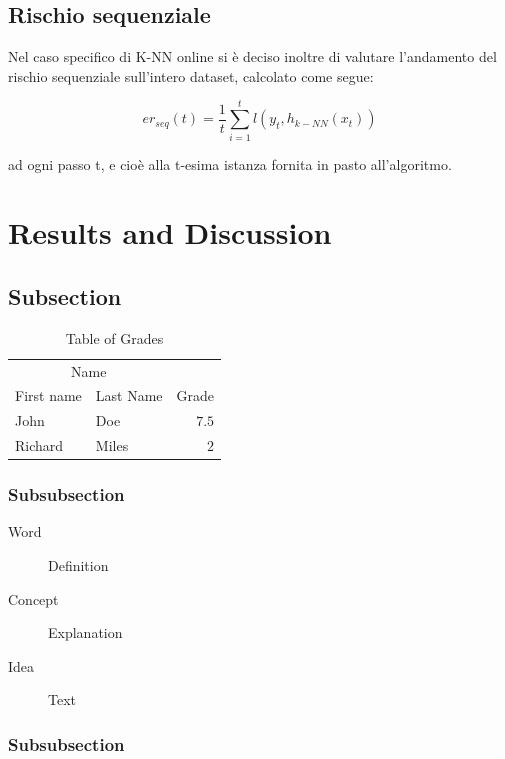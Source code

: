 \documentclass[fleqn,10pt]{SelfArx} %
\begin{document}
\subsection{Rischio sequenziale}
Nel caso specifico di K-NN online si è deciso inoltre di valutare l'andamento del rischio sequenziale sull'intero dataset, calcolato come segue:

\[
er_{seq}(t)=\frac{1}{t}\sum_{i=1}^{t} l(y_t,h_{k-NN}(x_t))
\]

ad ogni passo t, e cioè alla t-esima istanza fornita in pasto all'algoritmo.
\section{Results and Discussion}

\lipsum[10] %

\subsection{Subsection}

\lipsum[11] %

\begin{table}[hbt]
\caption{Table of Grades}
\centering
\begin{tabular}{llr}
\toprule
\multicolumn{2}{c}{Name} \\
\cmidrule(r){1-2}
First name & Last Name & Grade \\
\midrule
John & Doe & $7.5$ \\
Richard & Miles & $2$ \\
\bottomrule
\end{tabular}
\label{tab:label}
\end{table}

\subsubsection{Subsubsection}

\lipsum[12] %

\begin{description}
\item[Word] Definition
\item[Concept] Explanation
\item[Idea] Text
\end{description}

\subsubsection{Subsubsection}
\end{document}
